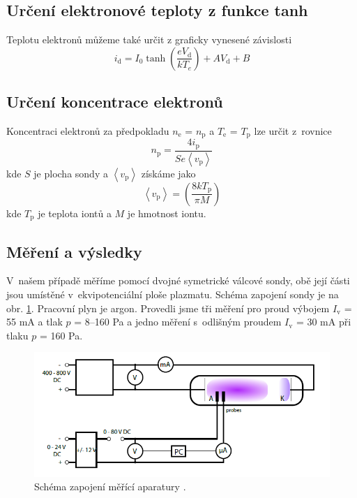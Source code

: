 \documentclass[a4paper,12pt]{article}
\begin{document}
\subsection{Určení elektronové teploty z funkce tanh}
Teplotu elektronů můžeme také určit z graficky
vynesené závislosti
\begin{equation}
	i_\text{{d}} = I_0 \tanh\left( \frac{e V_\text{{d}} }{k T_e} \right) + A V_\text{{d}} + B 
	\label{tanh}
\end{equation}

\subsection{Určení koncentrace elektronů}
Koncentraci elektronů za předpokladu $n_\text{{e}}$ = $n_\text{{p}}$
a $T_\text{{e}}$ = $T_\text{{p}}$
lze určit z~rovnice
\begin{equation}
	n_\text{{p}} = \frac{4  i_\text{{p}}}{S e \left\langle v_\text{{p}} 
	\right\rangle }
	\label{ne}
\end{equation}
kde $S$ je plocha sondy a $\left\langle  v_\text{{p}} \right\rangle$ získáme jako
\begin{equation}
	\left\langle v_\text{{p}} \right\rangle = \left( \frac{8 kT_\text{{p}}}{\pi 
	M} \right) 
	\label{vp}
\end{equation}
kde $T_\text{p}$ je teplota iontů a $M$ je hmotnost iontu.

\subsection{Měření a výsledky}
V~našem případě měříme pomocí dvojné symetrické válcové sondy,
obě její části jsou umístěné v~ekvipotenciální ploše plazmatu.
Schéma zapojení sondy je na obr. \ref{zapojenidvojna}. Pracovní
plyn je argon. Provedli jsme tři měření pro proud výbojem  $I_\text{{v}}$ =
55 \si{\milli\ampere} a tlak $p$ = 8--160 \si{\pascal} a jedno
měření s~odlišným proudem $I_\text{{v}}$ =
30 \si{\milli\ampere} při tlaku $p$ = 160 \si{\pascal}.

\begin{figure}[h]
	\centering
	\includegraphics[width=130mm]{zapojenidvojna.png}
	\caption{Schéma zapojení měřící aparatury \cite{navod}.}
	\label{zapojenidvojna}
\end{figure}
\end{document}
